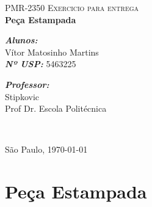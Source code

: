 \documentclass[a4paper, 12pt]{article}
\begin{document}
\begin{center}

\textsc{\large PMR-2350 Exercicio para entrega }\\[2cm]



{ \Huge \bfseries Peça Estampada}\\[3.4cm]

\begin{minipage}{0.5\textwidth}
\begin{flushleft}
\large \textbf{\emph{Alunos:}}\\
Vítor Matosinho Martins\\[0.1cm]
\large \textbf{\emph{Nº USP:}}
5463225\\


\end{flushleft}
\end{minipage}
\begin{minipage}{0.3\textwidth}
\begin{flushright}
\large \textbf{\emph{Professor:}} \\
Stipkovic\\
Prof Dr. Escola Politécnica
\end{flushright}
\end{minipage}\\[2.5cm]

\begin{center}
\large São Paulo, \today
\end{center}

\end{center}

\pagebreak

\tableofcontents
\listoffigures

\pagebreak

\section{Peça Estampada}
\end{document}
